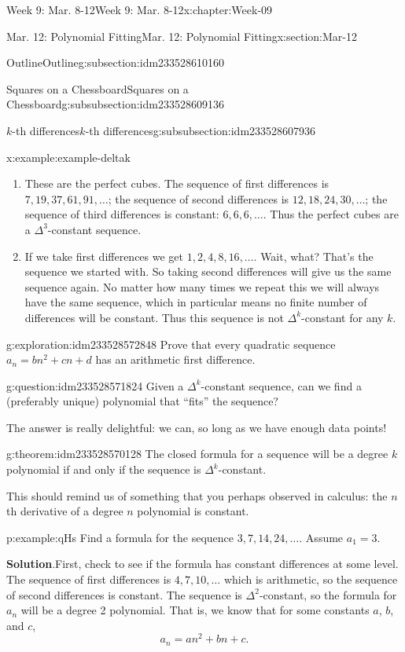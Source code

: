 \documentclass[oneside,10pt,]{book}
\newcommand{\blocktitlefont}{\relax}
\numberwithin{equation}{section}
\begin{document}
\begin{chapterptx}{Week 9: Mar. 8-12}{}{Week 9: Mar. 8-12}{}{}{x:chapter:Week-09}
\begin{sectionptx}{Mar. 12: Polynomial Fitting}{}{Mar. 12: Polynomial Fitting}{}{}{x:section:Mar-12}
\begin{subsectionptx}{Outline}{}{Outline}{}{}{g:subsection:idm233528610160}
\begin{subsubsectionptx}{Squares on a Chessboard}{}{Squares on a Chessboard}{}{}{g:subsubsection:idm233528609136}
\begin{subsubsectionptx}{\(k\)-th differences}{}{\(k\)-th differences}{}{}{g:subsubsection:idm233528607936}
\begin{example}{}{x:example:example-deltak}
\begin{enumerate}
\item{}These are the perfect cubes. The sequence of first differences is \(7, 19, 37, 61, 91, \ldots\); the sequence of second differences is \(12, 18, 24, 30,\ldots\); the sequence of third differences is constant: \(6,6,6,\ldots\). Thus the perfect cubes are a \(\Delta^3\)-constant sequence.%
\item{}If we take first differences we get \(1,2,4,8,16,\ldots\). Wait, what? That's the sequence we started with. So taking second differences will give us the same sequence again. No matter how many times we repeat this we will always have the same sequence, which in particular means no finite number of differences will be constant. Thus this sequence is not \(\Delta^k\)-constant for any \(k\).%
\end{enumerate}
%
\end{example}
\begin{exploration}{}{g:exploration:idm233528572848}%
Prove that every quadratic sequence \(a_n = bn^2 + cn + d\) has an arithmetic first difference.%
\end{exploration}%
\begin{question}{}{g:question:idm233528571824}%
Given a \(\Delta^k\)-constant sequence, can we find a (preferably unique) polynomial that ``fits'' the sequence?%
\end{question}
The answer is really delightful: we can, so long as we have enough data points!%
\begin{theorem}{}{}{g:theorem:idm233528570128}%
The closed formula for a sequence will be a degree \(k\) polynomial if and only if the sequence is \(\Delta^k\)-constant.%
\end{theorem}
This should remind us of something that you perhaps observed in calculus: the \(n\)th derivative of a degree \(n\) polynomial is constant.%
\begin{example}{}{p:example:qHs}%
Find a formula for the sequence \(3, 7, 14, 24,\ldots\). Assume \(a_1 = 3\).%
\par\smallskip%
\noindent\textbf{\blocktitlefont Solution}.\hypertarget{p:solution:byu}{}\quad{}First, check to see if the formula has constant differences at some level. The sequence of first differences is \(4, 7, 10, \ldots\) which is arithmetic, so the sequence of second differences is constant. The sequence is \(\Delta^2\)-constant, so the formula for \(a_n\) will be a degree 2 polynomial. That is, we know that for some constants \(a\), \(b\), and \(c\),%
\begin{equation*}
a_n = an^2 + bn + c\text{.}

\end{equation*}
\end{example}
\end{subsubsectionptx}
\end{subsubsectionptx}
\end{subsectionptx}
\end{sectionptx}
\end{chapterptx}
\end{document}
